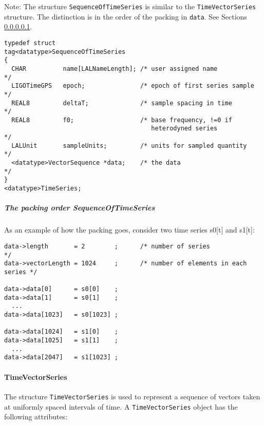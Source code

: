 \documentclass[]{ligodcc}
\renewcommand{\texttt}[1]{{\ttfamily\color{blue}#1}}
\begin{document}
\noindent
Note: The structure {\tt SequenceOfTimeSeries} is similar to the
{\tt TimeVectorSeries} structure. The distinction is in the order of the
packing in {\tt *data}.  See Sections \ref{packingorder}.

{\footnotesize
\begin{verbatim}
typedef struct
tag<datatype>SequenceOfTimeSeries
{
  CHAR          name[LALNameLength]; /* user assigned name           */
  LIGOTimeGPS   epoch;               /* epoch of first series sample */
  REAL8         deltaT;              /* sample spacing in time       */
  REAL8         f0;                  /* base frequency, !=0 if
                                        heterodyned series           */
  LALUnit       sampleUnits;         /* units for sampled quantity   */
  <datatype>VectorSequence *data;    /* the data                     */
}
<datatype>TimeSeries;
\end{verbatim}}

\subparagraph{The packing order {\texttt {SequenceOfTimeSeries}} \\}
\label{packingorder}

As an example of how the packing goes, consider two time series s0[t] and s1[t]:

{\footnotesize
\begin{verbatim}
data->length       = 2        ;      /* number of series                  */
data->vectorLength = 1024     ;      /* number of elements in each series */

data->data[0]      = s0[0]    ;
data->data[1]      = s0[1]    ;
  ...
data->data[1023]   = s0[1023] ;

data->data[1024]   = s1[0]    ;
data->data[1025]   = s1[1]    ;
  ...
data->data[2047]   = s1[1023] ;
\end{verbatim}}


\paragraph{{\texttt {TimeVectorSeries}}  \\}

The structure {\tt TimeVectorSeries} is used to represent a sequence of
vectors taken at uniformly spaced intervals of time. A
{\tt TimeVectorSeries} object has the following attributes:
\end{document}
